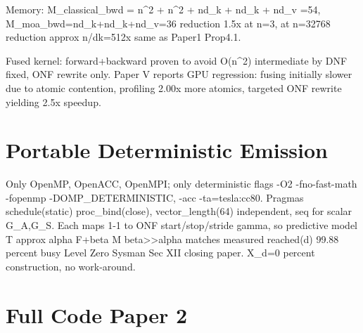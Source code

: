 \documentclass[11pt,a4paper]{article}
\begin{document}
Memory: M\_classical\_bwd = n^2 + n^2 + nd\_k + nd\_k + nd\_v =54, M\_moa\_bwd=nd\_k+nd\_k+nd\_v=36 reduction 1.5x at n=3, at n=32768 reduction approx n/dk=512x same as Paper1 Prop4.1.

Fused kernel: forward+backward proven to avoid O(n^2) intermediate by DNF fixed, ONF rewrite only. Paper V reports GPU regression: fusing initially slower due to atomic contention, profiling 2.00x more atomics, targeted ONF rewrite yielding 2.5x speedup.

\section{Portable Deterministic Emission}
Only OpenMP, OpenACC, OpenMPI; only deterministic flags -O2 -fno-fast-math -fopenmp -DOMP\_DETERMINISTIC, -acc -ta=tesla:cc80. Pragmas schedule(static) proc\_bind(close), vector\_length(64) independent, seq for scalar G\_A,G\_S. Each maps 1-1 to ONF start/stop/stride gamma, so predictive model T approx alpha F+beta M beta>>alpha matches measured reached(d) 99.88 percent busy Level Zero Sysman Sec XII closing paper. X\_d=0 percent construction, no work-around.

\appendix
\section{Full Code Paper 2}
\end{document}
